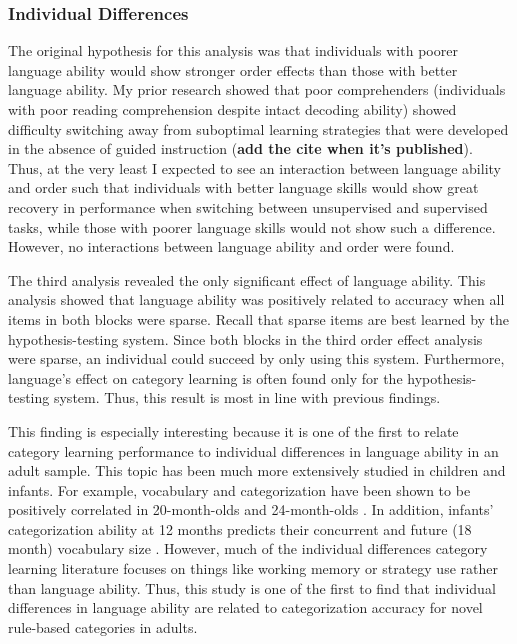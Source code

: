 \documentclass[../dissertation.tex]{subfiles}
\begin{document}
\subsubsection{Individual Differences}

	The original hypothesis for this analysis was that individuals with poorer language ability would show stronger order effects than those with better language ability. My prior research showed that poor comprehenders (individuals with poor reading comprehension despite intact decoding ability) showed difficulty switching away from suboptimal learning strategies that were developed in the absence of guided instruction (\textbf{add the cite when it's published}). Thus, at the very least I expected to see an interaction between language ability and order such that individuals with better language skills would show great recovery in performance when switching between unsupervised and supervised tasks, while those with poorer language skills would not show such a difference. However, no interactions between language ability and order were found. \par
	The third analysis revealed the only significant effect of language ability. This analysis showed that language ability was positively related to accuracy when all items in both blocks were sparse. Recall that sparse items are best learned by the hypothesis-testing system. Since both blocks in the third order effect analysis were sparse, an individual could succeed by only using this system. Furthermore, language's effect on category learning is often found only for the hypothesis-testing system. Thus, this result is most in line with previous findings. \par 
	This finding is especially interesting because it is one of the first to relate category learning performance to individual differences in language ability in an adult sample. This topic has been much more extensively studied in children and infants. For example, vocabulary and  categorization have been shown to be positively correlated in 20-month-olds \citep{Nazzi2001} and 24-month-olds \citep{Jaswal2007}. In addition, infants' categorization ability at 12 months predicts their concurrent and future (18 month) vocabulary size \citep{Ferguson2015}. However, much of the individual differences category learning literature focuses on things like working memory or strategy use rather than language ability. Thus, this study is one of the first to find that individual differences in language ability are related to categorization accuracy for novel rule-based categories in adults.
	
\end{document}
